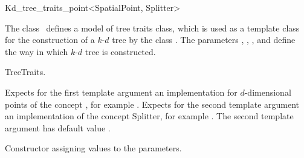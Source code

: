 

\begin{ccRefClass}{Kd_tree_traits_point<SpatialPoint, Splitter>}  %


\ccDefinition
  
The class \ccRefName\ defines a model of tree traits class, which is used as
a template class for the construction of a $k$-$d$ tree by the class .
The parameters , , , and   
define the way in which $k$-$d$ tree is constructed.



\ccIsModel

TreeTraits.

\ccParameters

Expects for the first template argument
an implementation for
$d$-dimensional points of
the concept , 
for example .
Expects for the second template argument an implementation of the concept {Splitter}, 
for example .
The second template argument has default value .

\ccTypes


\ccCreation
{}  %

{Constructor assigning values to the parameters.}


\end{ccRefClass}
